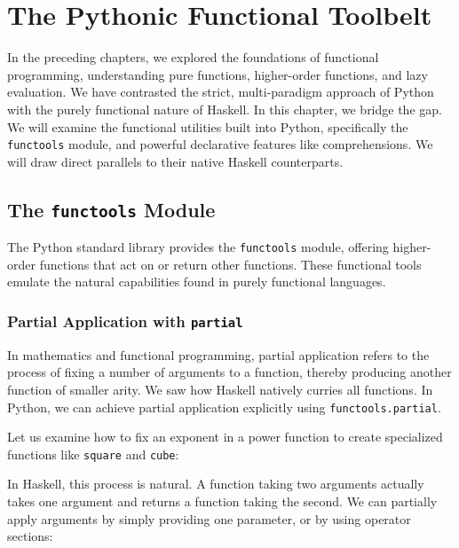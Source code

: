 \chapter{The Pythonic Functional Toolbelt}

In the preceding chapters, we explored the foundations of functional programming, understanding pure functions, higher-order functions, and lazy evaluation. We have contrasted the strict, multi-paradigm approach of Python with the purely functional nature of Haskell. In this chapter, we bridge the gap. We will examine the functional utilities built into Python, specifically the \texttt{functools} module, and powerful declarative features like comprehensions. We will draw direct parallels to their native Haskell counterparts.

\section{The \texttt{functools} Module}

The Python standard library provides the \texttt{functools} module, offering higher-order functions that act on or return other functions. These functional tools emulate the natural capabilities found in purely functional languages.

\subsection{Partial Application with \texttt{partial}}

In mathematics and functional programming, partial application refers to the process of fixing a number of arguments to a function, thereby producing another function of smaller arity. We saw how Haskell natively curries all functions. In Python, we can achieve partial application explicitly using \texttt{functools.partial}.

Let us examine how to fix an exponent in a power function to create specialized functions like \texttt{square} and \texttt{cube}:



In Haskell, this process is natural. A function taking two arguments actually takes one argument and returns a function taking the second. We can partially apply arguments by simply providing one parameter, or by using operator sections:



